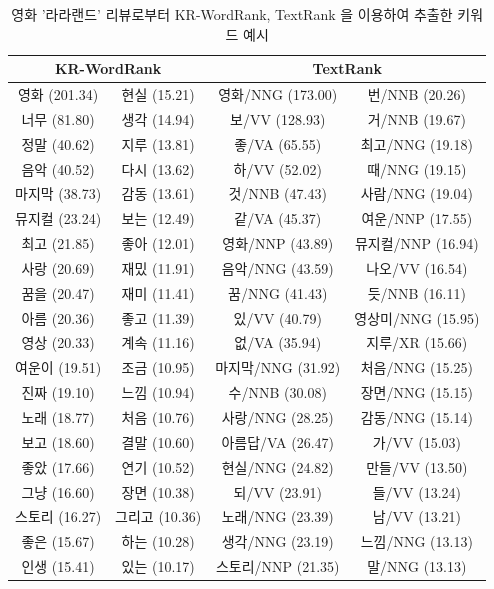 \documentclass[oneside, ko,phd]{snuthesis_utf8_kor}
\begin{document}
\begin{table}[H]
\centering
\small
\caption{영화 '라라랜드' 리뷰로부터 KR-WordRank, TextRank 을 이용하여 추출한 키워드 예시}
\label{tab:krwordrank_keyword_example}
\begin{tabular}{|c|c|c|c|}
\hline
\multicolumn{2}{|c|}{\textbf{KR-WordRank}} & \multicolumn{2}{c|}{\textbf{TextRank}} \\ \hline
영화 (201.34) & 현실 (15.21) & 영화/NNG (173.00) & 번/NNB (20.26) \\ \hline
너무 (81.80) & 생각 (14.94) & 보/VV (128.93) & 거/NNB (19.67) \\ \hline
정말 (40.62) & 지루 (13.81) & 좋/VA (65.55) & 최고/NNG (19.18) \\ \hline
음악 (40.52) & 다시 (13.62) & 하/VV (52.02) & 때/NNG (19.15) \\ \hline
마지막 (38.73) & 감동 (13.61) & 것/NNB (47.43) & 사람/NNG (19.04) \\ \hline
뮤지컬 (23.24) & 보는 (12.49) & 같/VA (45.37) & 여운/NNP (17.55) \\ \hline
최고 (21.85) & 좋아 (12.01) & 영화/NNP (43.89) & 뮤지컬/NNP (16.94) \\ \hline
사랑 (20.69) & 재밌 (11.91) & 음악/NNG (43.59) & 나오/VV (16.54) \\ \hline
꿈을 (20.47) & 재미 (11.41) & 꿈/NNG (41.43) & 듯/NNB (16.11) \\ \hline
아름 (20.36) & 좋고 (11.39) & 있/VV (40.79) & 영상미/NNG (15.95) \\ \hline
영상 (20.33) & 계속 (11.16) & 없/VA (35.94) & 지루/XR (15.66) \\ \hline
여운이 (19.51) & 조금 (10.95) & 마지막/NNG (31.92) & 처음/NNG (15.25) \\ \hline
진짜 (19.10) & 느낌 (10.94) & 수/NNB (30.08) & 장면/NNG (15.15) \\ \hline
노래 (18.77) & 처음 (10.76) & 사랑/NNG (28.25) & 감동/NNG (15.14) \\ \hline
보고 (18.60) & 결말 (10.60) & 아름답/VA (26.47) & 가/VV (15.03) \\ \hline
좋았 (17.66) & 연기 (10.52) & 현실/NNG (24.82) & 만들/VV (13.50) \\ \hline
그냥 (16.60) & 장면 (10.38) & 되/VV (23.91) & 들/VV (13.24) \\ \hline
스토리 (16.27) & 그리고 (10.36) & 노래/NNG (23.39) & 남/VV (13.21) \\ \hline
좋은 (15.67) & 하는 (10.28) & 생각/NNG (23.19) & 느낌/NNG (13.13) \\ \hline
인생 (15.41) & 있는 (10.17) & 스토리/NNP (21.35) & 말/NNG (13.13) \\ \hline
\end{tabular}
\end{table}
\end{document}
